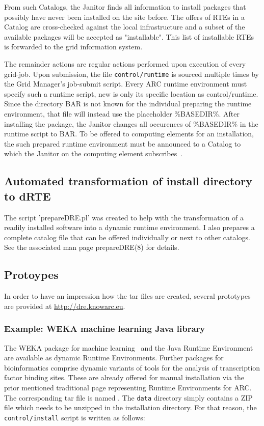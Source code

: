 {From such Catalogs, the Janitor finds all information to install
packages that possibly have never been installed on the site before. The
offers of RTEs in a Catalog are cross-checked against the local
infrastructure and a subset of the available packages will be accepted as
"installable". This list of installable RTEs is forwarded to the grid
information system.

The remainder actions are regular actions performed upon execution of every grid-job. Upon submission,
the file \texttt{control/runtime} is sourced multiple times by the Grid Manager's job-submit script. Every
ARC runtime environment must specify such a runtime script, new is only its specific location as control/runtime.
Since the directory \textdollar BAR is not known for the individual preparing the runtime environment, that
file will instead use the placeholder \%BASEDIR\%.  After installing the package, the Janitor changes all
occurences of \%BASEDIR\% in the runtime script to \textdollar BAR.  To be offered to computing elements
for an installation, the such prepared runtime environment must be announced to a Catalog to which the
Janitor on the computing element subscribes~\cite[p. 10]{BAYER_2007}.

\subsection{Automated transformation of install directory to dRTE}

The script 'prepareDRE.pl' was created to help with the transformation
of a readily installed software into a dynamic runtime environment.
I also prepares a complete catalog file that can be offered
individually or next to other catalogs. See the associated man page
prepareDRE(8) for details.

\subsection{Protoypes}

In order to have an impression how the tar files are created, several
prototypes are provided at \url{http://dre.knowarc.eu}.

\subsubsection{Example: WEKA machine learning Java library}

The WEKA package for machine learning~\cite{FRANK_20074} and the Java
Runtime Environment are available as dynamic Runtime Environments. Further
packages for bioinformatics comprise dynamic variants of tools for
the analysis of transcription factor binding sites. These are already
offered for manual installation via the prior mentioned traditional page
representing Runtime Environments for ARC.  The corresponding tar file
is named . The \texttt{data} directory simply contains
a ZIP file which needs to be unzipped in the installation directory. For
that reason, the \texttt{control/install} script is written as follows:

}
